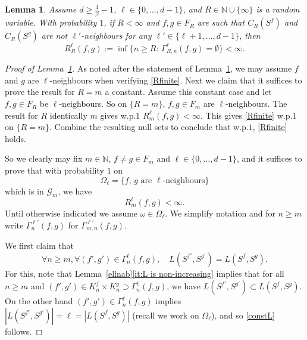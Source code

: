 \documentclass[10pt,a4paper]{amsart}
\newtheorem{lemma}{Lemma}
\newcommand{\N}{\mathbb{N}}
\newcommand{\cG}{\mathcal G}
\begin{document}
\begin{lemma}\label{gammaext}
Assume $d\ge\frac{4}{\beta}-1$, $\ell\in\{0,\dots,d-1\}$, and $R\in\N\cup\{\infty\}$ is a random
variable.
With probability $1$, 
if $R<\infty$ and $f,g\in F_R$ are such that $C_R(S^f)$ and $C_R(S^g)$ are not $\ell'$-neighbours for any $\ell'\in\{\ell+1,\dots,d-1\}$, then 
\begin{equation}\label{Rfinite}R_R^\ell(f,g):=\inf\{n\ge R:\, \Gamma^\ell_{R,n}(f,g)=\emptyset\}<\infty.
\end{equation}
\end{lemma}

\begin{proof}[Proof of Lemma~\ref{gammaext}]
As noted after the statement of Lemma~\ref{gammaext}, we may assume $f$ and $g$ are $\ell$-neighbours when verifying \eqref{Rfinite}. 
Next we claim that it suffices to prove the result for $R=m$ a constant.
Assume this constant case and let $f,g\in F_R$ be $\ell$-neighbours.  
So on $\{R=m\}$, $f,g\in F_m$ are $\ell$-neighbours. 
The result for $R$ identically $m$ gives w.p.$1$ $R_m^\ell(f,g)<\infty$.  
This gives \eqref{Rfinite} w.p.$1$ on $\{R=m\}$.  
Combine the resulting null sets to conclude that w.p.$1$, \eqref{Rfinite} holds.  

So we clearly may fix $m\in\N$, $f\neq g\in F_m$ and $\ell\in\{0,\dots,d-1\}$, and it suffices to prove that with probability $1$ on 
\[\Omega_\ell=\{\text{$f$, $g$ are $\ell$-neighbours}\}\]
which is in $\cG_m$, we have
\begin{equation}\label{Rmfinite}
R^\ell_m(f,g)<\infty.
\end{equation}
Until otherwise indicated we assume $\omega\in\Omega_\ell$. 
We simplify notation and for $n\ge m$ write $\Gamma_n^{\ell'}(f,g)$ for $\Gamma_{m,n}^{\ell'}(f,g)$. 

We first claim that 
\begin{equation}\label{constL}
\forall n\ge m, \forall (f',g')\in \Gamma_n^\ell(f,g), \quad L(S^{f'},S^{g'})=L(S^f,S^g).
\end{equation}
For this, note that Lemma~\ref{ellnab}\ref{it:L is non-increasing} implies that for all $n\ge m$ and $(f',g')\in K^f_n\times K_n^g\supset \Gamma_n^{\ell}(f,g)$, we have  $L(S^{f'},S^{g'})\subset L(S^f,S^g)$. 
On the other hand  $(f',g')\in\Gamma^\ell_n(f,g)$ implies $|L(S^{f'},S^{g'})|=\ell=|L(S^f,S^g)|$ (recall we work on $\Omega_\ell$), and so \eqref{constL} follows. 


\end{proof}
\end{document}
